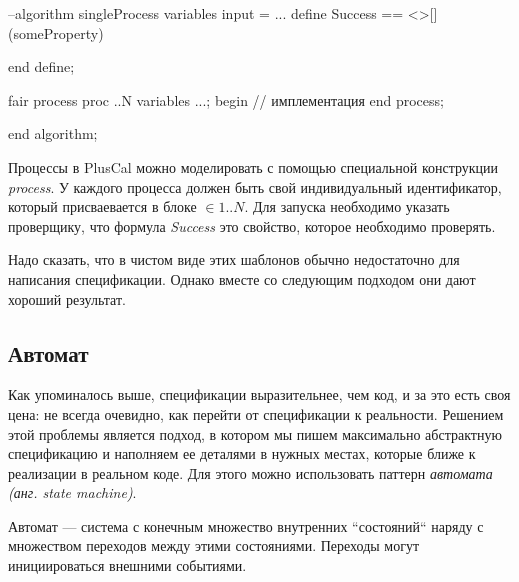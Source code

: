 \documentclass[14pt, openany]{book}
\begin{document}
\begin{ppcal}
  --algorithm singleProcess
    variables
      input = ...
    define
      Success == <>[](someProperty)
      
    end define;

    fair process proc ..N
    variables ...;
    begin
      \* // имплементация
    end process;

    end algorithm;
\end{ppcal}
\begin{tlatex}
%
%
%
%
%
\@pvspace{8.0pt}%
%
\@pvspace{8.0pt}%
%
%
%
%
%
\@xx{}%
%
\@pvspace{8.0pt}%
%
\end{tlatex}

Процессы в PlusCal можно моделировать с помощью специальной конструкции \emph{process}. У каждого процесса должен быть свой индивидуальный идентификатор, который присваевается в блоке \(\in 1..N\). Для запуска необходимо указать проверщику, что формула \emph{Success} это свойство, которое необходимо проверять.

Надо сказать, что в чистом виде этих шаблонов обычно недостаточно для написания спецификации. Однако вместе со следующим подходом они дают хороший результат.

\subsection{Автомат}
Как упоминалось выше, спецификации выразительнее, чем код, и за это есть своя цена: не всегда очевидно, как перейти от спецификации к реальности. Решением этой проблемы является подход, в котором мы пишем максимально абстрактную спецификацию и наполняем ее деталями в нужных местах, которые ближе к реализации в реальном коде. Для этого можно использовать паттерн \emph{автомата (анг. state machine)}.

Автомат --- система с конечным множество внутренних ``состояний`` наряду с множеством переходов между этими состояниями. Переходы могут инициироваться внешними событиями. 
\end{document}
